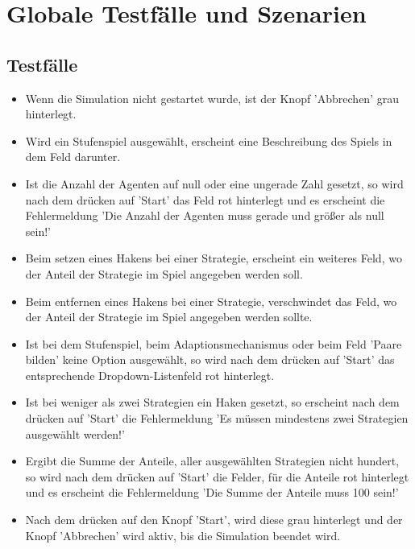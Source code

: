 \section{Globale Testfälle und Szenarien}

\subsection{Testfälle}

\begin{itemize}

\item Wenn die Simulation nicht gestartet wurde, ist der Knopf 'Abbrechen' grau hinterlegt.

\item Wird ein Stufenspiel ausgewählt, erscheint eine Beschreibung des Spiels in dem Feld darunter.

\item Ist die Anzahl der Agenten auf null oder eine ungerade Zahl gesetzt, so wird nach dem drücken auf 'Start' das Feld rot hinterlegt und es erscheint die Fehlermeldung 'Die Anzahl der Agenten muss gerade und größer als null sein!'

\item Beim setzen eines Hakens bei einer Strategie, erscheint ein weiteres Feld, wo der Anteil der Strategie im Spiel angegeben werden soll.

\item Beim entfernen eines Hakens bei einer Strategie, verschwindet das Feld, wo der Anteil der Strategie im Spiel angegeben werden sollte.

\item Ist bei dem Stufenspiel, beim Adaptionsmechanismus oder beim Feld 'Paare bilden' keine Option ausgewählt, so wird nach dem drücken auf 'Start' das entsprechende Dropdown-Listenfeld rot hinterlegt.

\item Ist bei weniger als zwei Strategien ein Haken gesetzt, so erscheint nach dem drücken auf 'Start' die Fehlermeldung 'Es müssen mindestens zwei Strategien ausgewählt werden!'

\item Ergibt die Summe der Anteile, aller ausgewählten Strategien nicht hundert, so wird nach dem drücken auf 'Start' die Felder, für die Anteile rot hinterlegt und es erscheint die Fehlermeldung 'Die Summe der Anteile muss 100 sein!'

\item Nach dem drücken auf den Knopf 'Start', wird diese grau hinterlegt und der Knopf 'Abbrechen' wird aktiv, bis die Simulation beendet wird.


\end{itemize}

